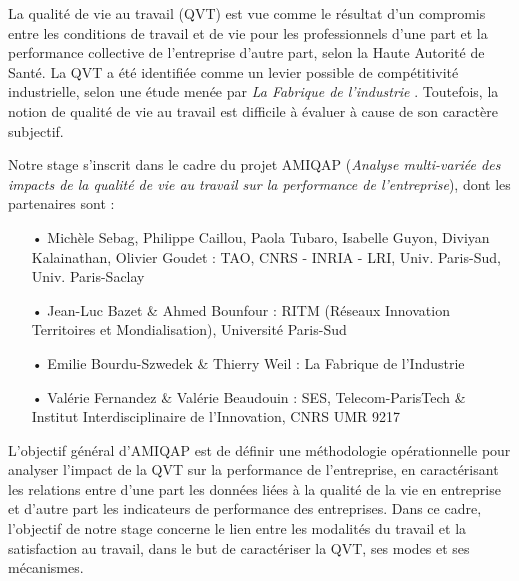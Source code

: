 \documentclass[11pt,fleqn,openany,frenchb]{book} %
\begin{document}
La qualité de vie au travail (QVT) est vue comme le résultat d'un compromis entre les conditions de travail et de vie pour les professionnels d'une part et la performance collective de l’entreprise d'autre part, selon la Haute Autorité de Santé. La QVT a été identifiée comme un levier possible de compétitivité industrielle, selon une étude menée par \textit{La Fabrique de l'industrie} \cite{bourdu2016qvt}. Toutefois, la notion de qualité de vie au travail est difficile à évaluer à cause de son caractère subjectif. \par %
Notre stage s'inscrit dans le cadre du projet AMIQAP ({\em Analyse multi-variée des impacts de la qualité de vie au travail sur la performance de l’entreprise}), dont les partenaires sont :\\ 
\begin{itemize}
\item[•] Michèle Sebag, Philippe Caillou, Paola Tubaro, Isabelle Guyon, Diviyan Kalainathan, Olivier Goudet : 
TAO, CNRS - INRIA - LRI, Univ. Paris-Sud, Univ. Paris-Saclay
\item[•] Jean-Luc Bazet \& Ahmed Bounfour :  RITM (Réseaux Innovation Territoires et Mondialisation), Université Paris-Sud
\item[•] Emilie Bourdu-Szwedek \& Thierry Weil : La Fabrique de l'Industrie
\item[•] Valérie Fernandez \& Valérie Beaudouin : SES, Telecom-ParisTech
\& Institut Interdisciplinaire de l'Innovation, CNRS UMR 9217\\
\end{itemize}

L'objectif général d'AMIQAP est de définir une méthodologie opérationnelle pour analyser l’impact de la QVT sur la performance de l’entreprise, en caractérisant les relations entre d’une part les données liées à la qualité de la vie en entreprise  et d’autre part les indicateurs de performance des entreprises. Dans ce cadre, l'objectif de notre stage concerne le lien entre les modalités du travail et la satisfaction au travail,  dans le but de caractériser la QVT, ses modes et ses mécanismes.\par
\end{document}
